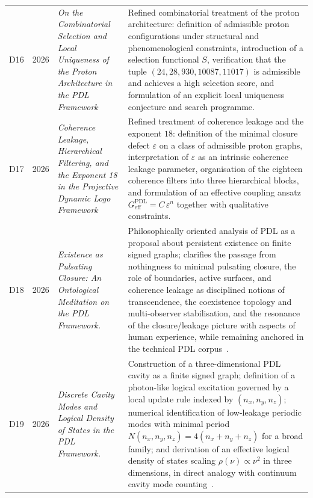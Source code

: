 \documentclass{article}
\newcommand{\PDL}{\mathrm{PDL}}
\begin{document}
\begin{longtable}{@{}llL{4cm}p{9.5cm}@{}}
D16 & 2026 & \textit{On the Combinatorial Selection and Local Uniqueness of the Proton Architecture in the PDL Framework} &
Refined combinatorial treatment of the proton architecture: definition of admissible proton configurations under structural and phenomenological constraints, introduction of a selection functional $S$, verification that the tuple $(24,28,930,10087,11017)$ is admissible and achieves a high selection score, and formulation of an explicit local uniqueness conjecture and search programme. \citep{Proton_Local_Uniqueness_2026,Combinatorial_Proton_v2_2026} \\[0.5em]

D17 & 2026 & \textit{Coherence Leakage, Hierarchical Filtering, and the Exponent 18 in the Projective Dynamic Logo Framework} &
Refined treatment of coherence leakage and the exponent $18$: definition of the minimal closure defect $\varepsilon$ on a class of admissible proton graphs, interpretation of $\varepsilon$ as an intrinsic coherence leakage parameter, organisation of the eighteen coherence filters into three hierarchical blocks, and formulation of an effective coupling ansatz $G_{\mathrm{eff}}^{\PDL}=C\,\varepsilon^{n}$ together with qualitative constraints. \citep{Coherence_Leakage_18_2026,Topological_Reformulation_PDL_2026,Effective_Fields_PDL_2026} \\[0.5em]

D18 &
2026 &
\emph{Existence as Pulsating Closure: An Ontological Meditation on the PDL Framework.} & 
Philosophically oriented analysis of PDL as a proposal about persistent existence on finite signed graphs; clarifies the passage from nothingness to minimal pulsating closure, the role of boundaries, active surfaces, and coherence leakage as disciplined notions of transcendence, the coexistence topology and multi-observer stabilisation, and the resonance of the closure/leakage picture with aspects of human experience, while remaining anchored in the technical PDL corpus~\citep{ExistencePulsatingClosure2026}.\\[0.4em]

D19 &
2026 &
\emph{Discrete Cavity Modes and Logical Density of States in the PDL Framework.}
 & Construction of a three-dimensional PDL cavity as a finite signed graph; definition of a photon-like logical excitation governed by a local update rule indexed by $(n_x,n_y,n_z)$; numerical identification of low-leakage periodic modes with minimal period $N(n_x,n_y,n_z)=4(n_x+n_y+n_z)$ for a broad family; and derivation of an effective logical density of states scaling $\rho(\nu)\propto \nu^2$ in three dimensions, in direct analogy with continuum cavity mode counting~\citep{PDLCavityModes2026}.\\[0.4em]

\bottomrule
\end{longtable}
\end{document}
